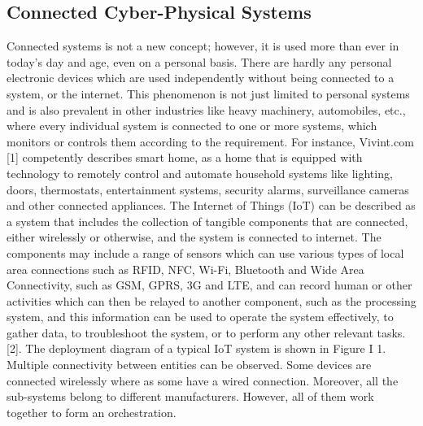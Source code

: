 \subsection{Connected Cyber-Physical Systems}

Connected systems is not a new concept; however, it is used more than ever in today’s day and age, even on a personal basis. There are hardly any personal electronic devices which are used independently without being connected to a system, or the internet. This phenomenon is not just limited to personal systems and is also prevalent in other industries like heavy machinery, automobiles, etc., where every individual system is connected to one or more systems, which monitors or controls them according to the requirement. For instance, Vivint.com [1] competently describes smart home, as a home that is equipped with technology to remotely control and automate household systems like lighting, doors, thermostats, entertainment systems, security alarms, surveillance cameras and other connected appliances. The Internet of Things (IoT) can be described as a system that includes the collection of tangible components that are connected, either wirelessly or otherwise, and the system is connected to internet. The components may include a range of sensors which can use various types of local area connections such as RFID, NFC, Wi-Fi, Bluetooth and Wide Area Connectivity, such as GSM, GPRS, 3G and LTE, and can record human or other activities which can then be relayed to another component, such as the processing system, and this information can be used to operate the system effectively, to gather data, to troubleshoot the system, or to perform any other relevant tasks. [2]. The deployment diagram of a typical IoT system is shown in Figure I 1. Multiple connectivity between entities can be observed. Some devices are connected wirelessly where as some have a wired connection. Moreover, all the sub-systems belong to different manufacturers. However, all of them work together to form an orchestration.

